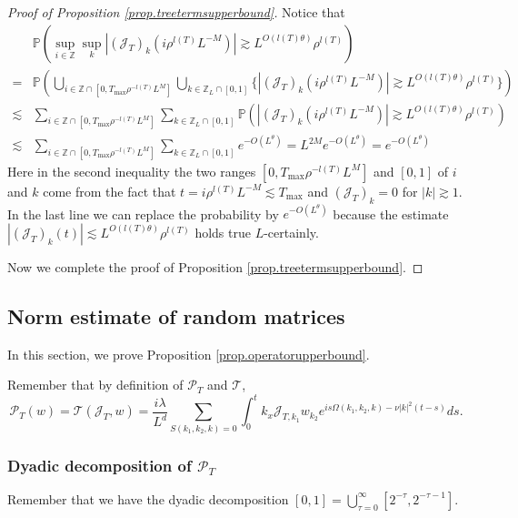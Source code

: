 \begin{proof}[Proof of Proposition \ref{prop.treetermsupperbound}]
Notice that 
\begin{equation}\label{eq.unionbound.threewave}
\begin{split}
    &\mathbb{P}\left(\sup_{i\in \mathbb{Z}} \sup_{k} |(\mathcal{J}_{T})_{k}(i\rho^{l(T)}L^{-M})|\gtrsim L^{O(l(T)\theta)} \rho^{l(T)}\right)
    \\
    =&\mathbb{P}\left(\bigcup_{i\in \mathbb{Z}\cap [0, T_{\text{max}}\rho^{-l(T)}L^{M}]}\bigcup_{k\in \mathbb{Z}_{L}\cap [0,1]}\{ |(\mathcal{J}_{T})_{k}(i\rho^{l(T)}L^{-M})|\gtrsim L^{O(l(T)\theta)} \rho^{l(T)}\}\right)
    \\
    \lesssim & \sum_{i\in \mathbb{Z}\cap [0, T_{\text{max}}\rho^{-l(T)}L^{M}]}\sum_{k\in \mathbb{Z}_{L}\cap [0,1]}\mathbb{P}\left( |(\mathcal{J}_{T})_{k}(i\rho^{l(T)}L^{-M})|\gtrsim L^{O(l(T)\theta)} \rho^{l(T)}\right)
    \\
    \lesssim & \sum_{i\in \mathbb{Z}\cap [0, T_{\text{max}}\rho^{-l(T)}L^{M}]}\sum_{k\in \mathbb{Z}_{L}\cap [0,1]} e^{-O(L^{\theta})}= L^{2M}e^{-O(L^{\theta})}=e^{-O(L^{\theta})}
\end{split}
\end{equation}
Here in the second inequality the two ranges $[0, T_{\text{max}}\rho^{-l(T)}L^{M}]$ and $[0,1]$ of $i$ and $k$ come from the fact that $t=i\rho^{l(T)}L^{-M}\lesssim  T_{\text{max}}$ and $(\mathcal{J}_{T})_{k}=0$ for $|k|\gtrsim 1$. In the last line we can replace the probability by $e^{-O(L^{\theta})}$ because the estimate $|(\mathcal{J}_{T})_{k}(t)|\lesssim L^{O(l(T)\theta)} \rho^{l(T)}$ holds true $L$-certainly. 

Now we complete the proof of Proposition \ref{prop.treetermsupperbound}.
\end{proof}


\subsection{Norm estimate of random matrices} \label{sec.randommatrices} In this section, we prove Proposition \ref{prop.operatorupperbound}. 

Remember that by definition of $\mathcal{P}_{T}$ and $\mathcal{T}$, 
\begin{equation}\label{eq.formulaP_T.threewave}
\mathcal{P}_{T}(w)=\mathcal{T}(\mathcal{J}_{T},w)=\frac{i\lambda}{L^{d}} \sum\limits_{S(k_1,k_2,k)=0}\int^{t}_0k_{x}\mathcal{J}_{T,k_1} w_{k_2}e^{i s\Omega(k_1,k_2,k)- \nu|k|^2(t-s)} ds.
\end{equation}    

\subsubsection{Dyadic decomposition of $\mathcal{P}_{T}$}
Remember that we have the dyadic decomposition $[0,1]= \bigcup_{\tau=0}^{\infty}[2^{-\tau},2^{-\tau-1}]$.

